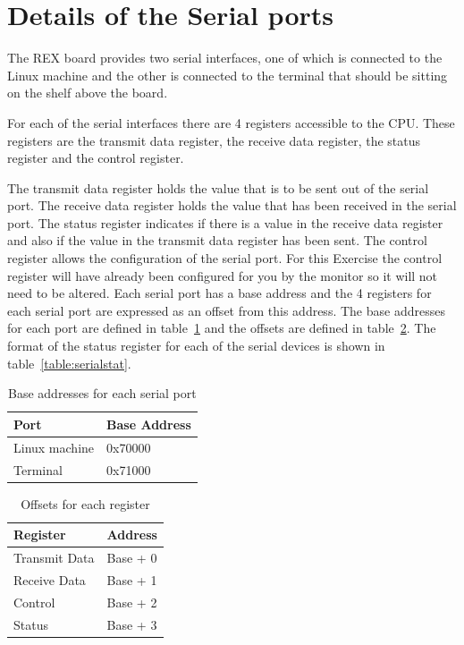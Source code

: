 \documentclass[a4paper,10pt]{article}
\begin{document}
\newpage
\section{Details of the Serial ports}
\label{org_sp_defn}



The REX board provides two serial interfaces, one of which is
connected to the Linux machine and the other is connected to the
terminal that should be sitting on the shelf above the board. 

For each of the serial interfaces there are 4 registers accessible to
the CPU. These registers are the transmit data register, the receive
data register, the status register and the control register.

The transmit data register holds the value that is to be sent out of
the serial port. The receive data register holds the value that has
been received in the serial port. The status register indicates if
there is a value in the receive data register and also if the value in
the transmit data register has been sent. The control register allows
the configuration of the serial port. For this Exercise the control
register will have already been configured for you by the monitor so
it will not need to be altered. Each serial port has a base address
and the 4 registers for each serial port are expressed as an offset
from this address. The base addresses for each port are defined in
table~\ref{table:serialbase} and the offsets are defined in
table~\ref{table:serialoffset}. The format of the status register for
each of the serial devices is shown in table~\ref{table:serialstat}.

\begin{table}[h]
\begin{center}
\begin{tabular}{|l|l|}
\hline
\textbf{Port} & \textbf{Base Address} \\
\hline
Linux machine & 0x70000 \\ 
\hline
Terminal & 0x71000 \\
\hline
\end{tabular}
\end{center}
\caption{Base addresses for each serial port}
\label{table:serialbase}
\end{table}

\begin{table}[h]
\begin{center}
\begin{tabular}{|l|l|}
\hline
\textbf{Register} & \textbf{Address} \\
\hline
Transmit Data & Base + 0 \\ 
\hline
Receive Data & Base + 1 \\
\hline
Control & Base + 2 \\
\hline
Status & Base + 3 \\
\hline
\end{tabular}
\end{center}
\caption{Offsets for each register}
\label{table:serialoffset}
\end{table}
\end{document}
